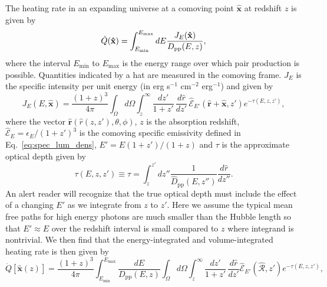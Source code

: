 \documentclass[numberedappendix]{emulateapj}
\begin{document}
The heating rate in an expanding universe at a comoving point $\mathbf{\hat{x}}$ at redshift $z$ is given by
\begin{equation}
  \dot{Q}(\mathbf{\hat{x}})= \int_{E_{\rm min}}^{E_{\rm max}} dE \frac{J_E(\mathbf{\hat{x}})}{D_{\mathrm{pp}}(E, z)},
\end{equation}
where the interval $E_{\mathrm{min}}$ to $E_{\mathrm{max}}$ is the energy range over which pair
production is possible. Quantities indicated by a hat are measured in the
comoving frame.
$J_E$ is the specific intensity per unit energy (in erg s$^{-1}$ cm$^{-2}$ erg$^{-1}$) and given by
\begin{equation}\label{eq:expanding J}
  J_E(E, \mathbf{\hat{x}}) = \frac {(1 + z)^3} {4\pi} \int_{\Omega} d\Omega \int_z^{\infty} \frac{d z'}{1+z'}\,\frac{d\hat{r}}{dz'}\, {\hat{\mathcal{E}}_{E'}(\mathbf{\hat{r}}+\mathbf{\hat{x}}, z')}e^{-\tau(E,z,z')},
\end{equation}
where the vector $\mathbf{\hat{r}}(\hat{r}(z,z'), \theta, \phi)$, $z$ is the absorption redshift, $\hat{\mathcal{E}}_E = \epsilon_E/(1+z')^3$ is the comoving specific emissivity defined in Eq.~\eqref{eq:spec_lum_dens}, $E' = E (1+z')/(1+z)$ and $\tau$ is the approximate optical depth given by
\begin{equation}
\label{eq:tau}
\tau(E,z,z')\equiv \tau=\int_z^{z'}dz''\frac{1}{\hat D_{\mathrm{pp}}(E,z'')}\frac{d\hat r}{dz''}.
\end{equation}
An alert reader will recognize that the true optical depth must include the effect of a changing $E'$ as we integrate from $z$ to $z'$.  Here we assume the typical mean free paths for high energy photons are much smaller than the Hubble length so that $E' \approx E$ over the redshift interval is small compared to $z$  where integrand is nontrivial.  
We then find that the energy-integrated and volume-integrated heating rate is then given by 
\begin{equation}
  \label{eq:int_exp_heat}
  \dot{Q}[\mathbf{\hat{x}}(z)]=\frac{(1+z)^3}{4\pi }\int_{E_{\mathrm{min}}}^{E_{\mathrm{max}}} \frac{dE}{D_{\mathrm{pp}}(E,z)}\int_{\Omega}d\Omega\int_z^{\infty} \frac{d z'}{1+z'}\,\frac{d\hat r}{dz'}\mathcal{\hat E}_{E'}(\mathbf{\hat{\mathcal{R}}}, z') e^{-\tau(E,z,z')},
\end{equation}
\end{document}
